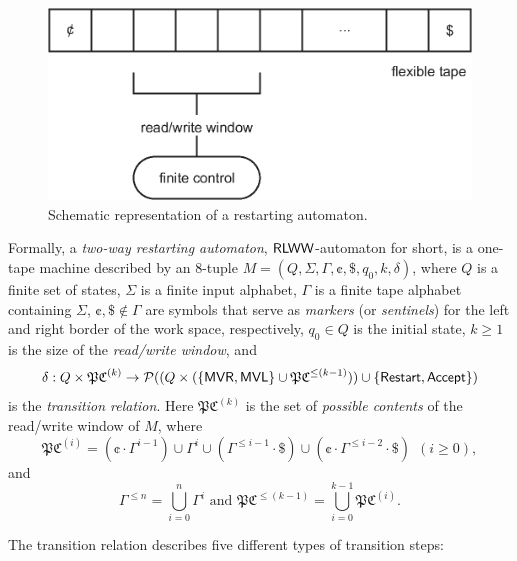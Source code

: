 \begin{figure}[htp]
\centering
\includegraphics[scale=1.0]{img/restarting_automaton.eps}
\caption[Schematic representation of a restarting automaton.]
{Schematic representation of a restarting automaton.}
\label{figure:restarting_automaton}
\end{figure}

Formally, a \emph{two-way restarting automaton}, $\textup{\sf RLWW}$-automaton for short, is a one-tape machine described by an $8$-tuple $M = (Q, \Sigma, \Gamma, \cent, \$, q_0, k, \delta)$, where $Q$ is a finite set of states, $\Sigma$ is a finite input alphabet, $\Gamma$ is a finite tape alphabet containing $\Sigma$, \index{$\cent$}\index{$\$$}$\cent, \$ \notin \Gamma$ are symbols that serve as \emph{markers} (or \emph{sentinels}) for the left and right border of the work space, respectively, $q_0 \in Q$ is the initial state, $k \ge 1$ is the size of the \emph{read/write window}, and $$\delta: Q \times \mathfrak{PC}^{(k)} \to \mathcal{P}((Q \times (\{\textup{\sf MVR}, \textup{\sf MVL}\} \cup \mathfrak{PC}^{\le (k-1)})) \cup \{\textup{\sf Restart}, \textup{\sf Accept}\})$$ is the \emph{transition relation}. Here $\mathfrak{PC}^{(k)}$ is the set of \emph{possible contents} of the read/write window of $M$, where $$\mathfrak{PC}^{(i)} = (\cent \cdot \Gamma^{i-1}) \cup \Gamma^i \cup (\Gamma^{\le i-1} \cdot \$) \cup (\cent \cdot \Gamma^{\le i-2} \cdot \$)\ \ (i \ge 0),$$ and $$\Gamma^{\le n} = \bigcup_{i=0}^n \Gamma^i \text{ and } \mathfrak{PC}^{\le (k-1)} = \bigcup_{i=0}^{k-1}\mathfrak{PC}^{(i)}.$$

The transition relation describes five different types of transition steps:

